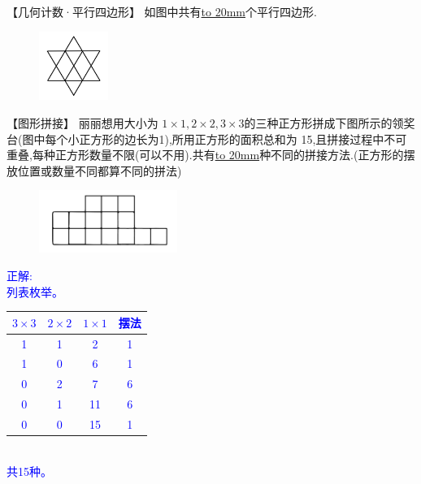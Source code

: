 \item {
    【几何计数·平行四边形】
    如图中共有\underline{\hbox to 20mm{}}个平行四边形.
    \begin{figure}[H] 
        \centering
        \includegraphics[width=0.2\textwidth]{./pics/Chapter_4/2017_1.png}
    \end{figure}
}

\item {
    【图形拼接】
    丽丽想用大小为 $1\times 1, 2\times 2, 3\times 3$的三种正方形拼成下图所示的领奖台(图中每个小正方形的边长为1),所用正方形的面积总和为 15,且拼接过程中不可重叠,每种正方形数量不限(可以不用).共有\underline{\hbox to 20mm{}}种不同的拼接方法.(正方形的摆放位置或数量不同都算不同的拼法)
    \begin{figure}[H] 
        \centering
        \includegraphics[width=0.4\textwidth]{./pics/Chapter_4/9.png}
    \end{figure}
    \ifshowSolution 
        \fangsong{}\textcolor{blue}{
            正解: \\
            列表枚举。\\
            \begin{tabular}{|c|c|c|c|}
                \hline
                $3\times 3$ & $2\times 2$ & $1\times 1$ & 摆法 \\
                \hline
                1 & 1 & 2 & 1 \\
                1 & 0 & 6 & 1 \\
                0 & 2 & 7 & 6 \\
                0 & 1 & 11 & 6 \\
                0 & 0 & 15 & 1 \\
                \hline
            \end{tabular} \\
            共15种。
        }
    \else
        \vspace{1cm}
    \fi
}

